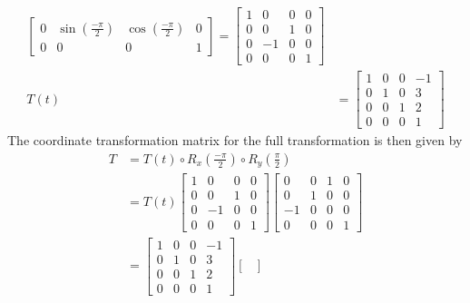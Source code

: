 \documentclass[10pt]{article}
\begin{document}
\begin{enumerate}
\begin{align*}
\begin{bmatrix}
                0 & \sin{\left(\frac{-\pi}{2}\right)} & \cos{\left(\frac{-\pi}{2}\right)} & 0 \\
                0 & 0 & 0 & 1
            \end{bmatrix} = \begin{bmatrix}
                1 & 0 & 0 & 0 \\
                0 & 0 & 1 & 0 \\
                0 & -1 & 0 & 0 \\
                0 & 0 & 0 & 1
            \end{bmatrix} \\
            T(t) &= \begin{bmatrix}
                1 & 0 & 0 & -1 \\
                0 & 1 & 0 & 3 \\
                0 & 0 & 1 & 2 \\
                0 & 0 & 0 & 1
            \end{bmatrix}
        \end{align*}
        The coordinate transformation matrix for the full transformation is then given by
        \begin{align*}
            T &= T(t) \circ R_{x}\left(\frac{-\pi}{2}\right) \circ R_{y}\left(\frac{\pi}{2}\right) \\
            &= T(t) \begin{bmatrix}
                1 & 0 & 0 & 0 \\
                0 & 0 & 1 & 0 \\
                0 & -1 & 0 & 0 \\
                0 & 0 & 0 & 1
            \end{bmatrix} \begin{bmatrix}
                0 & 0 & 1 & 0 \\
                0 & 1 & 0 & 0 \\
                -1 & 0 & 0 & 0 \\
                0 & 0 & 0 & 1
            \end{bmatrix} \\
            &= \begin{bmatrix}
                1 & 0 & 0 & -1 \\
                0 & 1 & 0 & 3 \\
                0 & 0 & 1 & 2 \\
                0 & 0 & 0 & 1
            \end{bmatrix} \begin{bmatrix}

\end{bmatrix}
\end{align*}
\end{enumerate}
\end{document}
